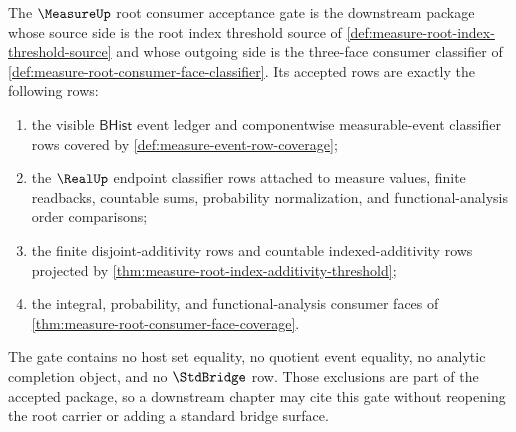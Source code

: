 \begin{definition}
\label{def:measure-root-consumer-acceptance-gate}
The $\MeasureUp$ root consumer acceptance gate is the downstream package whose
source side is the root index threshold source of
\autoref{def:measure-root-index-threshold-source} and whose outgoing side is
the three-face consumer classifier of
\autoref{def:measure-root-consumer-face-classifier}. Its accepted rows are
exactly the following rows:
\begin{enumerate}
  \item the visible $\mathsf{BHist}$ event ledger and componentwise
  measurable-event classifier rows covered by
  \autoref{def:measure-event-row-coverage};
  \item the $\RealUp$ endpoint classifier rows attached to measure values,
  finite readbacks, countable sums, probability normalization, and
  functional-analysis order comparisons;
  \item the finite disjoint-additivity rows and countable indexed-additivity
  rows projected by
  \autoref{thm:measure-root-index-additivity-threshold};
  \item the integral, probability, and functional-analysis consumer faces of
  \autoref{thm:measure-root-consumer-face-coverage}.
\end{enumerate}
The gate contains no host set equality, no quotient event equality, no analytic
completion object, and no $\StdBridge$ row. Those exclusions are part of the
accepted package, so a downstream chapter may cite this gate without reopening
the root carrier or adding a standard bridge surface.
\end{definition}

